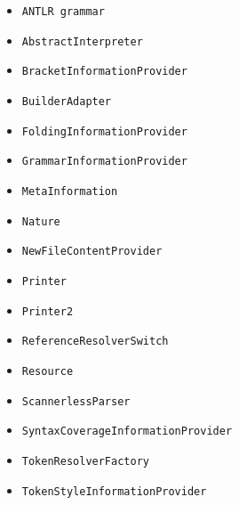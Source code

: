 \begin{itemize}
\item \texttt{ANTLR grammar}
\item \texttt{AbstractInterpreter}
\item \texttt{BracketInformationProvider}
\item \texttt{BuilderAdapter}
\item \texttt{FoldingInformationProvider}
\item \texttt{GrammarInformationProvider}
\item \texttt{MetaInformation}
\item \texttt{Nature}
\item \texttt{NewFileContentProvider}
\item \texttt{Printer}
\item \texttt{Printer2}
\item \texttt{ReferenceResolverSwitch}
\item \texttt{Resource}
\item \texttt{ScannerlessParser}
\item \texttt{SyntaxCoverageInformationProvider}
\item \texttt{TokenResolverFactory}
\item \texttt{TokenStyleInformationProvider}
\end{itemize}
